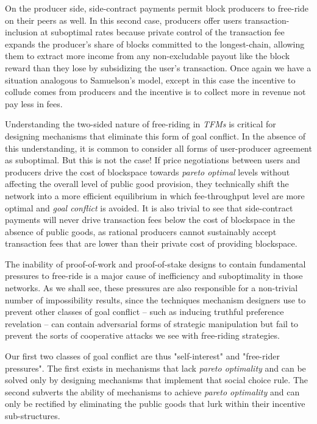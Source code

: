 \documentclass[sigconf,anonymous]{aamas}
\begin{document}
On the producer side, side-contract payments permit block producers to free-ride on their peers as well. In this second case, producers offer users transaction-inclusion at suboptimal rates because private control of the transaction fee expands the producer's share of blocks committed to the longest-chain, allowing them to extract more income from any non-excludable payout like the block reward than they lose by subsidizing the user's transaction. Once again we have a situation analogous to Samuelson's model, except in this case the incentive to collude comes from producers and the incentive is to collect more in revenue not pay less in fees.

Understanding the two-sided nature of free-riding in \textit{TFMs} is critical for designing mechanisms that eliminate this form of goal conflict. In the absence of this understanding, it is common to consider all forms of user-producer agreement as suboptimal. But this is not the case! If price negotiations between users and producers drive the cost of blockspace towards \textit{pareto optimal} levels without affecting the overall level of public good provision, they technically shift the network into a more efficient equilibrium in which fee-throughput level are more optimal and \textit{goal conflict} is avoided. It is also trivial to see that side-contract payments will never drive transaction fees below the cost of blockspace in the absence of public goods, as rational producers cannot sustainably accept transaction fees that are lower than their private cost of providing blockspace. 

The inability of proof-of-work and proof-of-stake designs to contain fundamental pressures to free-ride is a major cause of inefficiency and suboptimality in those networks. As we shall see, these pressures are also responsible for a non-trivial number of impossibility results, since the techniques mechanism designers use to prevent other classes of goal conflict -- such as inducing truthful preference revelation -- can contain adversarial forms of strategic manipulation but fail to prevent the sorts of cooperative attacks we see with free-riding strategies.

Our first two classes of goal conflict are thus "self-interest" and "free-rider pressures". The first exists in mechanisms that lack \textit{pareto optimality} and can be solved only by designing mechanisms that implement that social choice rule. The second subverts the ability of mechanisms to achieve \textit{pareto optimality} and can only be rectified by eliminating the public goods that lurk within their incentive sub-structures.
\end{document}
